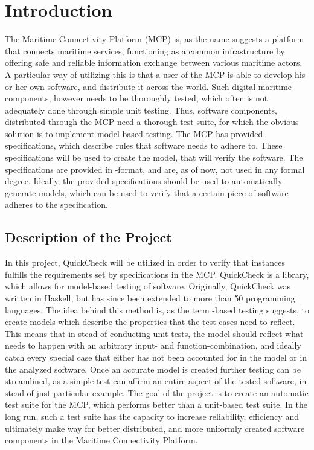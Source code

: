 \chapter{Introduction}
The Maritime Connectivity Platform \cite{mcp} (MCP) is, as the name suggests a platform that connects maritime services, functioning as a common infrastructure by offering safe and reliable information exchange between various maritime actors. A particular way of utilizing this is that a user of the MCP is able to develop his or her own software, and distribute it across the world. Such digital maritime components, however needs to be thoroughly tested, which often is not adequately done through simple unit testing. Thus, software components, distributed through the MCP need a thorough test-suite, for which the obvious solution is to implement model-based testing.
The MCP has provided specifications, which describe rules that software needs to adhere to. These specifications will be used to create the model, that will verify the software. The specifications are provided in -format, and are, as of now, not used in any formal degree. Ideally, the provided specifications should be used to automatically generate models, which can be used to verify that a certain piece of software adheres to the specification. 
\section{Description of the Project}
In this project, QuickCheck \cite{quickcheck} will be utilized in order to verify that instances fulfills the requirements set by specifications in the MCP.
QuickCheck is a library, which allows for model-based testing of software. Originally, QuickCheck was written in Haskell, but has since been extended to more than 50 programming languages. The idea behind this method is, as the term -based testing suggests, to create models which describe the properties that the test-cases need to reflect. This means that in stead of conducting unit-tests, the model should reflect what needs to happen with an arbitrary input- and function-combination, and ideally catch every special case that either has not been accounted for in the model or in the analyzed software.
Once an accurate model is created further testing can be streamlined, as a simple test can affirm an entire aspect of the tested software, in stead of just  particular example.
The goal of the project is to create an automatic test suite for the MCP, which performs better than a unit-based test suite. In the long run, such a test suite has the capacity to increase reliability, efficiency and ultimately make way for better distributed, and more uniformly created software components in the Maritime Connectivity Platform.

